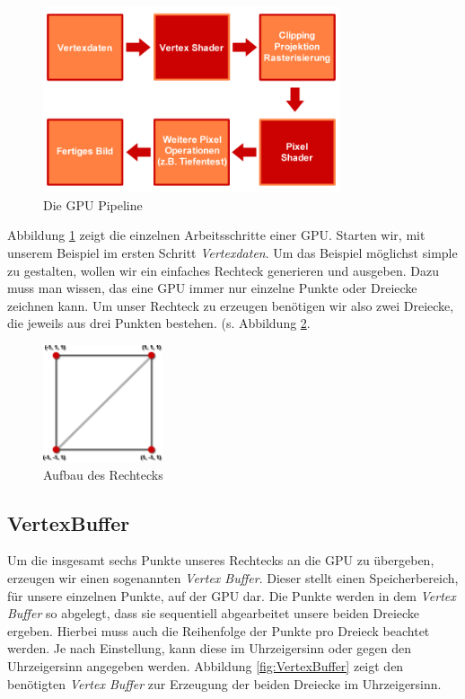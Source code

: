 \begin{Spacing}{\mylinespace}
\begin{figure}[h!]
	\vspace*{20px}
	\centering
	\includegraphics[width=330px]{graphics/pipeline.png}	
	\caption{Die GPU Pipeline}
	\label{fig:pipeline}
\end{figure}

Abbildung \ref{fig:pipeline} zeigt die einzelnen Arbeitsschritte einer GPU. Starten wir, mit unserem Beispiel im ersten Schritt \textit{Vertexdaten}. Um das Beispiel möglichst simple zu gestalten, wollen wir ein einfaches Rechteck generieren und ausgeben. Dazu muss man wissen, das eine GPU immer nur einzelne Punkte oder Dreiecke zeichnen kann. Um unser Rechteck zu erzeugen benötigen wir also zwei Dreiecke, die jeweils aus drei Punkten bestehen. (s. Abbildung \ref{fig:Viereck}.

\begin{figure}[h!]
	\vspace*{30px}
	\centering
	\includegraphics[height=130px]{graphics/Quad2.png}	
	\caption{Aufbau des Rechtecks}
	\label{fig:Viereck}
\end{figure}

\subsection{VertexBuffer}
Um die insgesamt sechs Punkte unseres Rechtecks an die GPU zu übergeben, erzeugen wir einen sogenannten \textit{Vertex Buffer}. Dieser stellt einen Speicherbereich, für unsere einzelnen Punkte, auf der GPU dar. Die Punkte werden in dem \textit{Vertex Buffer} so abgelegt, dass sie sequentiell abgearbeitet unsere beiden Dreiecke ergeben. Hierbei muss auch die Reihenfolge der Punkte pro Dreieck beachtet werden. Je nach Einstellung, kann diese im Uhrzeigersinn oder gegen den Uhrzeigersinn angegeben werden. Abbildung \ref{fig:VertexBuffer} zeigt den benötigten \textit{Vertex Buffer} zur Erzeugung der beiden Dreiecke im Uhrzeigersinn.


\end{Spacing}
